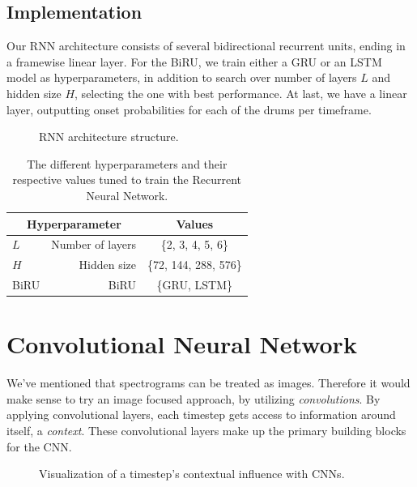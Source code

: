 \subsection{Implementation}

Our \gls{RNN} architecture consists of several bidirectional recurrent units, ending in a framewise linear layer. For the \gls{BiRU}, we train either a \gls{GRU} or an \gls{LSTM} model as hyperparameters, in addition to search over number of layers $L$ and hidden size $H$, selecting the one with best performance. At last, we have a linear layer, outputting onset probabilities for each of the drums per timeframe.

\begin{figure}[H]
    \centering
    
    \caption{RNN architecture structure.}
    \label{RNNFigure}
\end{figure}

\begin{table}[H]
    \centering
    \begin{tabular}{lr|c}
        \multicolumn{2}{c|}{Hyperparameter} & Values       \\
        \hline
        $L$ & Number of layers      & \{2, 3, 4, 5, 6\} \\
        $H$ & Hidden size      & \{72, 144, 288, 576\} \\
        \gls{BiRU} & \acrlong{BiRU} & \{\gls{GRU}, \gls{LSTM}\}\\
    \end{tabular}
    \caption{The different hyperparameters and their respective values tuned to train the Recurrent Neural Network.}
    \label{RNNHyperparams}
\end{table}

\section{Convolutional Neural Network}

We've mentioned that spectrograms can be treated as images. Therefore it would make sense to try an image focused approach, by utilizing \textit{convolutions}. By applying convolutional layers, each timestep gets access to information around itself, a \textit{context}. These convolutional layers make up the primary building blocks for the \gls{CNN}.

\begin{figure}[H]
    \centering
    
    \caption{Visualization of a timestep's contextual influence with CNNs.}
    \label{CNNInfluenceFigure}
\end{figure}

